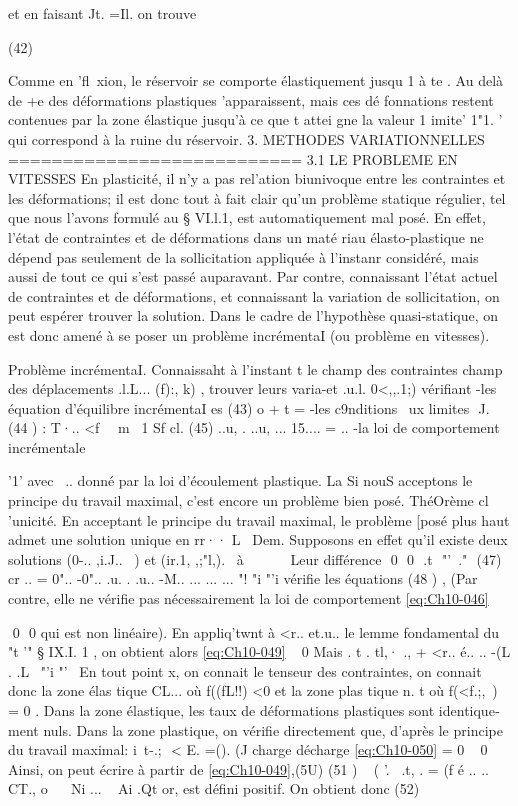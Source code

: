 et en faisant Jt. =Il. on trouve 

(42) 

Comme en 'fl~xion, le réservoir se comporte élastiquement jusqu 1 à 
te . Au delà de +e des déformations plastiques 'apparaissent, mais ces dé­
fonnations restent contenues par la zone élastique jusqu'à ce que t attei­
gne la valeur 1 imite' 1"1. ' qui correspond à la ruine du réservoir. 
3. METHODES VARIATIONNELLES 
=========================== 
3.1 LE PROBLEME EN VITESSES 
En plasticité, il n'y a pas rel'ation biunivoque entre les contrain­tes et les déformations; il est donc tout à fait clair qu'un problème stati­que régulier, tel que nous l'avons formulé au § VI.l.1, est automatiquement mal posé. En effet, l'état de contraintes et de déformations dans un maté­
riau élasto-plastique ne dépend pas seulement de la sollicitation appliquée 
à l'instanr considéré, mais aussi de tout ce qui s'est passé auparavant. Par contre, connaissant l'état actuel de contraintes et de déformations, et con­naissant la variation de sollicitation, on peut espérer trouver la solution. Dans le cadre de l'hypothèse quasi-statique, on est donc amené à se poser un problème incrémentaI (ou problème en vitesses). 

Problème incrémentaI. Connaissaht à l'instant t le champ des contraintes champ des déplacements .l.L... (f):, k) , trouver leurs varia-et .u.l. 0<,,.1;) vérifiant -les équation d'équilibre incrémentaI es 
(43) o
+ t = 
-les c9nditions ~ux limites 
 J. 
(44 ) : 
T·..
<f~~ m~ 1 Sf 
cl.
(45) ..u, . 
..u, ... 15.... = .. 
-la loi de comportement incrémentale 

'1'
avec ~.. donné par la loi d'écoulement plastique.
La 
Si nouS acceptons le principe du travail maximal, c'est encore 
un problème bien posé. 
ThéOrème cl 'unicité. En acceptant le principe du travail maximal, le problème [posé plus haut admet une solution unique en rr·· 
L~ 
Dem. Supposons en effet qu'il existe deux solutions (0-.. ,i.J..~ ) et (ir.1, ,;"l,).
~à ~ ~~ ~ 
Leur différence 
 0  0  .t  "'\
." 
(47) cr .. = 0".. -0".. .u. . .u.. -M.. 
... ... ...
"! "i "'i 
vérifie les équations 
(48 ) , 
(Par contre, elle ne vérifie pas nécessairement la loi de comportement \eqref{eq:Ch10-046} 

 0  0 
qui est non linéaire). En appliq'twnt à <r.. et.u.. le lemme fondamental du "t '" 
§ IX.I. 1 , on obtient alors 
\eqref{eq:Ch10-049} ~ 0 Mais 
. t . tl,· .,
+ <r.. é.. .. -(L . 
.L~ "'i "'~ 
En tout point x, on connait le tenseur des contraintes, on connait donc la 
zone élas tique CL... où f((fL!!) <0 et la zone plas tique n. t où f(<f.;,~) = 0 . 
Dans la zone élastique, les taux de déformations plastiques sont identique­
ment nuls. Dans la zone plastique, on vérifie directement que, d'après le 
principe du travail maximal: 
i\
t-.;  < E. =(). 
(J 
charge décharge 
\eqref{eq:Ch10-050} = 0 ~ 0 
Ainsi, on peut écrire à partir de \eqref{eq:Ch10-049},(5U) 
(51 ) 
~
( 
'.~ .t, . 
= (f é .. .. CT., o
~~ Ni ... ~ Ai
.Qt 
or, est défini positif. On obtient donc 
(52) 

